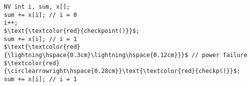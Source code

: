 \documentclass[border={20pt 5pt 10pt 10pt}]{standalone} %
\begin{document}
\begin{lstlisting}[style=mystyle, linewidth=115px]
NV int i, sum, x[];
sum += x[i]; // i = 0
i++;
$\text{\textcolor{red}{checkpoint()}}$;
sum += x[i]; // i = 1
$\text{\textcolor{red}{\lightning\hspace{0.3cm}\lightning\hspace{0.12cm}}}$ // power failure
$\textcolor{red}{\circlearrowright\hspace{0.28cm}}\text{\textcolor{red}{checkp()}}$;
sum += x[i]; // i = 1
\end{lstlisting}
\end{document}
